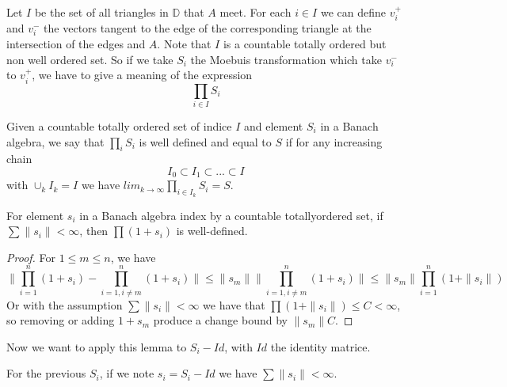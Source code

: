 Let $I$ be the set of all triangles in $\mathbb{D}$ that $A$ meet. For each $i\in I$ we can define $v_i^+$ and $v_i^-$ the vectors tangent to the edge of the corresponding triangle at the intersection of the edges and $A$. Note that $I$ is a countable totally ordered but non well ordered set. So if we take $S_i$ the Moebuis transformation which take $v_i^-$ to $v_i^+$, we have to give a meaning of the expression \[
\prod_{i\in I}S_i
\]

\begin{dfnt}
Given a countable totally ordered set of indice $I$ and element $S_i$ in a Banach algebra, we say that $\prod_i S_i$ is well defined and equal to $S$ if for any increasing chain \[
I_0 \subset I_1 \subset ... \subset I
\]
with $\cup_k I_k=I$ we have $lim_{k \to \infty} \prod_{i \in I_k}S_i =S $.
\end{dfnt}

\begin{lem}
For element $s_i$ in a Banach algebra index by a countable totallyordered set, if $\sum \| s_i \| < \infty$, then $\prod(1+s_i)$ is well-defined.
\end{lem}
\begin{proof}
For $1 \leq m \leq n$, we have \[
\| \prod_{i=1}^n(1+s_i)-\prod_{i=1,i \neq m}^n (1+s_i) \| \leq \|s_m \| \| \prod_{i=1,i \neq m}^n (1+s_i) \| \leq \|s_m\| \prod_{i=1}^n (1+\|s_i\|)
\]
Or with the assumption $\sum \| s_i \| < \infty$ we have that $\prod(1+\|s_i\|) \leq C < \infty$, so removing or adding $1+s_m$ produce a change bound by $\|s_m\| C$.
\end{proof}

Now we want to apply this lemma to $S_i - Id$, with $Id$ the identity matrice.

\begin{lem}
For the previous $S_i$, if we note $s_i=S_i - Id$ we have $\sum \| s_i \| < \infty$.
\end{lem}


